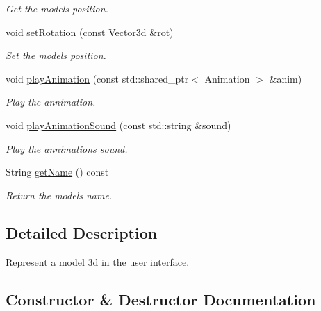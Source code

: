 \begin{DoxyCompactItemize}
\begin{DoxyCompactList}\small\item\em Get the model\textquotesingle{}s position. \end{DoxyCompactList}\item 
void \hyperlink{classModel3d_adc3c185a679687b4bf483f89eb2c20a9}{set\+Rotation} (const Vector3d \&rot)
\begin{DoxyCompactList}\small\item\em Set the model\textquotesingle{}s position. \end{DoxyCompactList}\item 
void \hyperlink{classModel3d_a108ab9c13b7ae24cc1711c2e97fbc625}{play\+Animation} (const std\+::shared\+\_\+ptr$<$ Animation $>$ \&anim)
\begin{DoxyCompactList}\small\item\em Play the annimation. \end{DoxyCompactList}\item 
void \hyperlink{classModel3d_a6ce79286c43bd4a6852c544bdad8ee18}{play\+Animation\+Sound} (const std\+::string \&sound)
\begin{DoxyCompactList}\small\item\em Play the annimation\textquotesingle{}s sound. \end{DoxyCompactList}\item 
\mbox{\label{classModel3d_afa0ccf1c5b0c571afcfbef4a894e6b3a}} 
String \hyperlink{classModel3d_afa0ccf1c5b0c571afcfbef4a894e6b3a}{get\+Name} () const
\begin{DoxyCompactList}\small\item\em Return the model\textquotesingle{}s name. \end{DoxyCompactList}\end{DoxyCompactItemize}


\subsection{Detailed Description}
Represent a model 3d in the user interface. 

\subsection{Constructor \& Destructor Documentation}
\mbox{\label{classModel3d_a3382c1519f85b695a1d98b492207c339}} 
